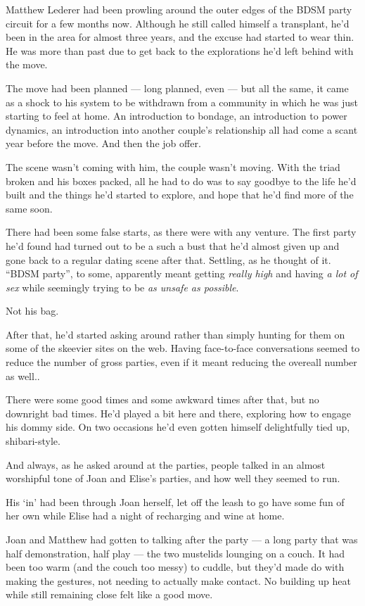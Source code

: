 Matthew Lederer had been prowling around the outer edges of the BDSM
party circuit for a few months now. Although he still called himself a
transplant, he'd been in the area for almost three years, and the excuse
had started to wear thin. He was more than past due to get back to the
explorations he'd left behind with the move.

The move had been planned --- long planned, even --- but all the same,
it came as a shock to his system to be withdrawn from a community in
which he was just starting to feel at home. An introduction to bondage,
an introduction to power dynamics, an introduction into another couple's
relationship all had come a scant year before the move. And then the job
offer.

The scene wasn't coming with him, the couple wasn't moving. With the
triad broken and his boxes packed, all he had to do was to say goodbye
to the life he'd built and the things he'd started to explore, and hope
that he'd find more of the same soon.

There had been some false starts, as there were with any venture. The
first party he'd found had turned out to be a such a bust that he'd
almost given up and gone back to a regular dating scene after that.
Settling, as he thought of it. ``BDSM party'', to some, apparently meant
getting \emph{really high} and having \emph{a lot of sex} while
seemingly trying to be \emph{as unsafe as possible}.

Not his bag.

After that, he'd started asking around rather than simply hunting for
them on some of the skeevier sites on the web. Having face-to-face
conversations seemed to reduce the number of gross parties, even if it
meant reducing the overeall number as well..

There were some good times and some awkward times after that, but no
downright bad times. He'd played a bit here and there, exploring how to
engage his dommy side. On two occasions he'd even gotten himself
delightfully tied up, shibari-style.

And always, as he asked around at the parties, people talked in an
almost worshipful tone of Joan and Elise's parties, and how well they
seemed to run.

His `in' had been through Joan herself, let off the leash to go have
some fun of her own while Elise had a night of recharging and wine at
home.

Joan and Matthew had gotten to talking after the party --- a long party
that was half demonstration, half play --- the two mustelids lounging on
a couch. It had been too warm (and the couch too messy) to cuddle, but
they'd made do with making the gestures, not needing to actually make
contact. No building up heat while still remaining close felt like a
good move.

